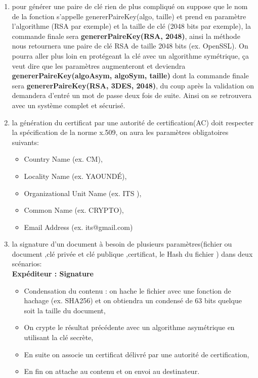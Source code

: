 \documentclass[12pt,a4paper]{article}
\begin{document}
		\begin{enumerate}
			\item pour générer une paire de clé rien de plus compliqué on suppose que le nom de la fonction s'appelle genererPaireKey(algo, taille) et prend en paramètre l'algorithme (RSA par exemple) et la taille de clé (2048 bits par exemple), la commande finale sera \textbf{ genererPaireKey(RSA, 2048)}, ainsi la méthode nous retournera une paire de clé RSA de taille 2048 bits (ex. OpenSSL). On pourra aller plus loin en protégeant la clé avec un algorithme symétrique, ça veut dire que les paramètres augmenteront et deviendra\textbf{ genererPaireKey(algoAsym, algoSym, taille)} dont la commande finale sera \textbf{genererPaireKey(RSA, 3DES, 2048)}, du coup après la validation on demandera d'entré un mot de passe deux fois de suite. Ainsi on se retrouvera avec un système complet et sécurisé.
			
			\item la génération du certificat par une autorité de certification(AC) doit respecter la spécification de la norme x.509, on aura les paramètres obligatoires suivants:
			\begin{itemize}
				\item Country Name (ex. CM),
				\item Locality Name (ex. YAOUNDÉ),
				\item Organizational Unit Name (ex. ITS ),
				\item Common Name (ex. CRYPTO),
				\item  Email Address (ex. its@gmail.com)
			\end{itemize}
			
			\item la signature d'un document à besoin de plusieurs paramètres(fichier ou document ,clé privée et clé publique ,certificat, le Hash du fichier ) dans deux scénarios:\\
		
			
			\textbf{Expéditeur : Signature}	\\
			\begin{itemize}
				\item Condensation du contenu : on hache le fichier avec une fonction de hachage (ex. SHA256) et on obtiendra un condensé de 63 bits quelque soit la taille du document,
				\item On crypte le résultat précédente avec un algorithme asymétrique en utilisant la clé secrète,
				\item En suite on associe un certificat délivré par une autorité de certification,
				\item  En fin on attache au contenu et on envoi au destinateur.\\
			\end{itemize}
			

\end{enumerate}
\end{document}
